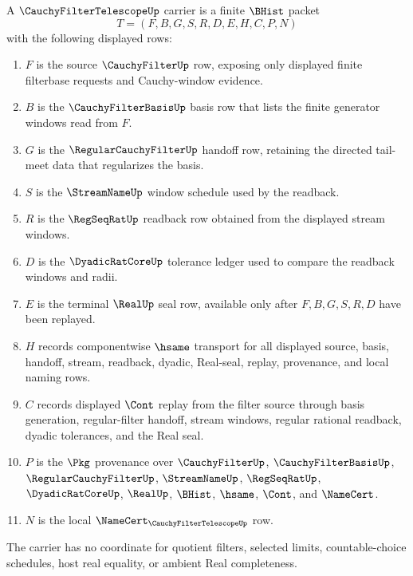 \begin{definition}
\label{def:cauchy-filter-telescope-carrier}
A $\CauchyFilterTelescopeUp$ carrier is a finite $\BHist$ packet
$$
T=(F,B,G,S,R,D,E,H,C,P,N)
$$
with the following displayed rows:
\begin{enumerate}
\item $F$ is the source $\CauchyFilterUp$ row, exposing only displayed finite filterbase requests and Cauchy-window evidence.
\item $B$ is the $\CauchyFilterBasisUp$ basis row that lists the finite generator windows read from $F$.
\item $G$ is the $\RegularCauchyFilterUp$ handoff row, retaining the directed tail-meet data that regularizes the basis.
\item $S$ is the $\StreamNameUp$ window schedule used by the readback.
\item $R$ is the $\RegSeqRatUp$ readback row obtained from the displayed stream windows.
\item $D$ is the $\DyadicRatCoreUp$ tolerance ledger used to compare the readback windows and radii.
\item $E$ is the terminal $\RealUp$ seal row, available only after $F,B,G,S,R,D$ have been replayed.
\item $H$ records componentwise $\hsame$ transport for all displayed source, basis, handoff, stream, readback, dyadic, Real-seal, replay, provenance, and local naming rows.
\item $C$ records displayed $\Cont$ replay from the filter source through basis generation, regular-filter handoff, stream windows, regular rational readback, dyadic tolerances, and the Real seal.
\item $P$ is the $\Pkg$ provenance over $\CauchyFilterUp$, $\CauchyFilterBasisUp$, $\RegularCauchyFilterUp$, $\StreamNameUp$, $\RegSeqRatUp$, $\DyadicRatCoreUp$, $\RealUp$, $\BHist$, $\hsame$, $\Cont$, and $\NameCert$.
\item $N$ is the local $\NameCert_{\CauchyFilterTelescopeUp}$ row.
\end{enumerate}
The carrier has no coordinate for quotient filters, selected limits, countable-choice schedules, host real equality, or ambient Real completeness.
\end{definition}


